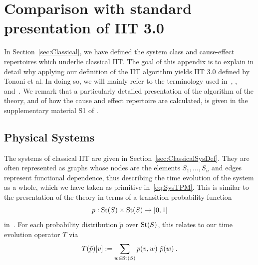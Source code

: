\appendix

\section{Comparison with standard presentation of IIT 3.0} \label{sec:comparison}
In Section~\ref{sec:Classical}, we have defined the system class and cause-effect repertoires which underlie classical IIT.
The goal of this appendix is to explain in detail why applying our definition of the IIT algorithm yields IIT 3.0 defined by Tononi et al. In doing so, we will mainly refer to the terminology used in~\cite{tononi.2015.scholarpedia}, \cite{mayner2018pyphi}, \cite{oizumi2014phenomenology} and~\cite{marshall2016integrated}. We remark that a particularly detailed presentation of the algorithm of the theory, and of how the cause and effect repertoire are calculated, is given in the supplementary material S1 of \cite{mayner2018pyphi}.


\subsection{Physical Systems}
The systems of classical IIT are given in Section~\ref{sec:ClassicalSysDef}. They are often represented as graphs whose nodes are the elements $S_1, \dots , S_n$ and edges represent functional dependence, thus describing the time evolution of the system as a whole, which we have taken as primitive in~\eqref{eq:SysTPM}. This is similar to the presentation of the theory in terms of a transition probability function
\[ p: \text{St}(S) \times \text{St}(S) \rightarrow [0,1]
\]
in~\cite{marshall2016integrated}. For each probability distribution $\tilde p$ over $\text{St}(S)$, this relates to our time evolution operator $T$ via 
\[
T( \tilde p)[v] := \sum_{w \in \text{St}(S)} p(v,w) \ \tilde p(w) \:.
\]

